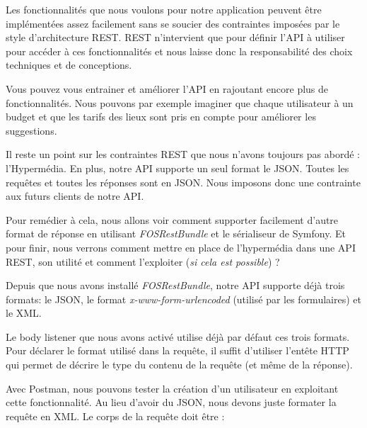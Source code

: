 \documentclass[big]{zmdocument}
\begin{document}
\horizontalLine



Les fonctionnalités que nous voulons pour notre application peuvent être implémentées assez facilement sans se soucier des contraintes imposées par le style d'architecture REST.
REST n'intervient que pour définir l'API à utiliser pour accéder à ces fonctionnalités et nous laisse donc la responsabilité des choix techniques et de conceptions.



Vous pouvez vous entrainer et améliorer l'API en rajoutant encore plus de fonctionnalités. Nous pouvons par exemple imaginer que chaque utilisateur à un budget et que les tarifs des lieux sont pris en compte pour améliorer les suggestions.





Il reste un point sur les contraintes REST que nous n'avons toujours pas abordé : l'Hypermédia. En plus, notre API supporte un seul format le JSON. Toutes les requêtes et toutes les réponses sont en JSON. Nous imposons donc une contrainte aux futurs clients de notre API.



Pour remédier à cela, nous allons voir comment supporter facilement d'autre format de réponse en utilisant \textit{FOSRestBundle} et le sérialiseur de Symfony.
Et pour finir, nous verrons comment mettre en place de l'hypermédia dans une API REST, son utilité et comment l'exploiter (\textit{si cela est possible}) ?







Depuis que nous avons installé \textit{FOSRestBundle}, notre API supporte déjà trois formats: le JSON, le format \textit{x-www-form-urlencoded} (utilisé par les formulaires) et le XML.



Le body listener que nous avons activé utilise déjà par défaut ces trois formats. Pour déclarer le format utilisé dans la requête, il suffit d'utiliser l'entête HTTP  qui permet de décrire le type du contenu de la requête (et même de la réponse).



Avec Postman, nous pouvons tester la création d'un utilisateur en exploitant cette fonctionnalité. Au lieu d'avoir du JSON, nous devons juste formater la requête en XML.
Le corps de la requête doit être :
\end{document}
